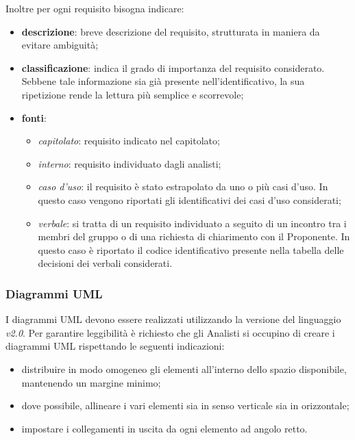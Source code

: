             \noindent Inoltre per ogni requisito bisogna indicare: 
            \begin{itemize}
               	\item{\textbf{descrizione}}: breve descrizione del requisito, strutturata in maniera da evitare ambiguità; 
               	
               	\item{\textbf{classificazione}}: indica il grado di importanza del requisito considerato. Sebbene tale informazione sia già presente nell'identificativo, la sua ripetizione rende la lettura più semplice e scorrevole;	
               	
               	\item{\textbf{fonti}}:   
               	\begin{itemize}
               		\item \textit{capitolato}: requisito indicato nel capitolato; 
               		\item \textit{interno}: requisito individuato dagli analisti; 
               		\item \textit{caso d'uso}: il requisito è stato estrapolato da uno o più casi d'uso. In questo caso vengono riportati gli identificativi dei casi d'uso considerati; 
               		\item \textit{verbale}: si tratta di un requisito individuato a seguito di un incontro tra i membri del gruppo o di una richiesta di chiarimento con il Proponente. 
               		In questo caso è riportato il codice identificativo presente nella tabella delle decisioni dei verbali considerati. 
               	\end{itemize} 
            \end{itemize} 
                     
        \subsubsection*{Diagrammi UML}
        I diagrammi UML devono essere realizzati utilizzando la versione del linguaggio \textit{v2.0}.
        Per garantire leggibilità è richiesto che gli Analisti si occupino di creare i diagrammi UML 
        rispettando le seguenti indicazioni: 
        \begin{itemize}
           	\item distribuire in modo omogeneo gli elementi all'interno dello spazio disponibile, mantenendo un margine minimo; 
           	\item dove possibile, allineare i vari elementi sia in senso verticale sia in orizzontale; 
           	\item impostare i collegamenti in uscita da ogni elemento ad angolo retto.  
        \end{itemize}
        
